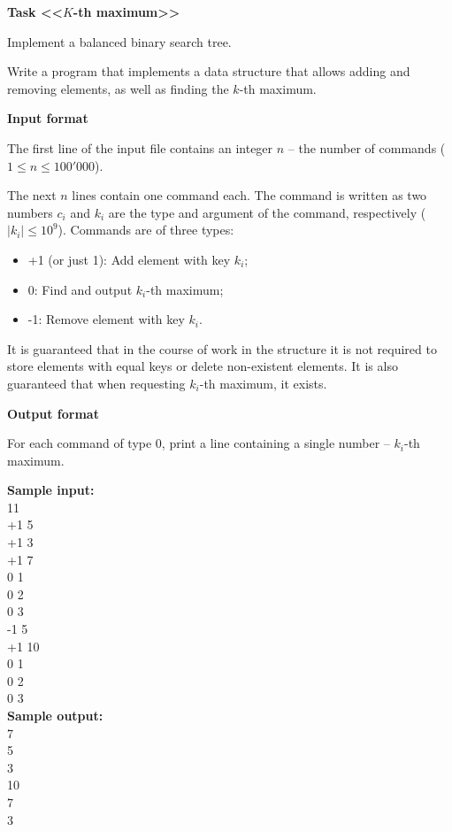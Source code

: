 \documentclass[a4paper]{article}
\begin{document}
\textbf{Task <<$K$-th maximum>>}

Implement a balanced binary search tree.

Write a program that implements a data structure that allows adding and removing elements, as well as finding the $k$-th maximum.

\SPACE

\textbf{Input format}

The first line of the input file contains an integer $n$ -- the number of commands ($1 \le n \le 100'000$).

The next $n$ lines contain one command each. The command is written as two numbers $c_i$ and $k_i$ are the type and argument of the command, respectively ($|k_i| \le 10^9$). Commands are of three types:
\begin{itemize}
\item +1 (or just 1): Add element with key $k_i$;
\item 0: Find and output $k_i$-th maximum;
\item -1: Remove element with key $k_i$.
\end{itemize}

It is guaranteed that in the course of work in the structure it is not required to store elements with equal keys or delete non-existent elements. It is also guaranteed that when requesting $k_i$-th maximum, it exists.

\SPACE

\textbf{Output format}

For each command of type $0$, print a line containing a single number -- $k_i$-th maximum.

\LINE

\noindent \textbf{Sample input:}\\
11\\
+1 5\\
+1 3\\
+1 7\\
0 1\\
0 2\\
0 3\\
-1 5\\
+1 10\\
0 1\\
0 2\\
0 3\\

\noindent \textbf{Sample output:}\\
7\\
5\\
3\\
10\\
7\\
3\\
\end{document}
